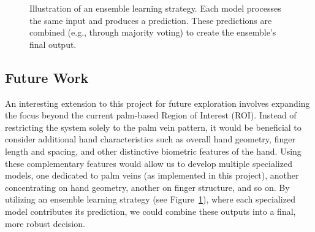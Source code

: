 \begin{figure}[h]
    \centering
    \caption{Illustration of an ensemble learning strategy. Each model processes the same input and produces a prediction. These predictions are combined (e.g., through majority voting) to create the ensemble's final output.}
    \label{fig:ensemble}
\end{figure}

\subsection{Future Work}

An interesting extension to this project for future exploration involves expanding the focus beyond the current palm-based Region of Interest (ROI). Instead of restricting the system solely to the palm vein pattern, it would be beneficial to consider additional hand characteristics such as overall hand geometry, finger length and spacing, and other distinctive biometric features of the hand. Using these complementary features would allow us to develop multiple specialized models, one dedicated to palm veins (as implemented in this project), another concentrating on hand geometry, another on finger structure, and so on. By utilizing an ensemble learning strategy (see Figure~\ref{fig:ensemble}), where each specialized model contributes its prediction, we could combine these outputs into a final, more robust decision. 